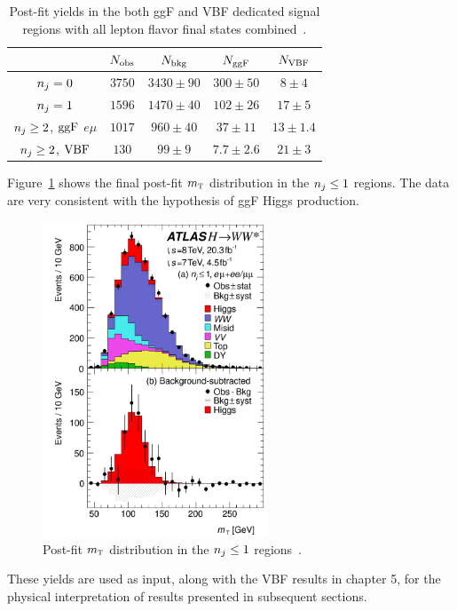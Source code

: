 \begin{table}[h!]
\centering
\captionsetup{justification=centering}

\hspace{-10pt}
\begin{tabular}{|c|c|c|c|c|}
\hline
 & $N_{\rm obs}$ & $N_{\rm bkg}$ & $N_{\rm ggF}$ & $N_{\rm VBF}$ \\ \hline
$n_j = 0$ & $3750$ & $3430 \pm 90$ & $300 \pm 50$ & $8 \pm 4$ \\ \hline
$n_j = 1$ & $1596$ & $1470 \pm 40$ & $102 \pm 26$ & $17 \pm 5$ \\ \hline
$n_j \geq 2$, $\rm ggF$ $e\mu$ & $1017$ & $960 \pm 40$ & $37 \pm 11$ & $13 \pm 1.4$ \\ \hline
$n_j \geq 2$, $\rm VBF$ & $130$ & $99 \pm 9$ & $7.7 \pm 2.6$ & $21 \pm 3$ \\ \hline
\end{tabular}

\caption{
Post-fit yields in the both ggF and VBF dedicated signal regions with all lepton flavor final states combined~\cite{WW2015}. 
}
\label{tab:final-yields}
\end{table}

Figure~\ref{fig:ggF-mT} shows the final post-fit $m_{\textrm{\footnotesize\sc t}}$ distribution in the $n_j \leq 1$ regions. The data are very consistent with the hypothesis of ggF Higgs production. 
%
\begin{figure}[h!]
  \centering
  \captionsetup{justification=centering}

  \includegraphics[width=0.6\textwidth]{figures/ggF_mT}
  \caption{Post-fit $m_{\textrm{\footnotesize\sc t}}$ distribution in the $n_j \leq 1$ regions~\cite{WW2015}.}
  \label{fig:ggF-mT}
\end{figure}
%
These yields are used as input, along with the VBF results in chapter 5, for the physical interpretation of results presented in subsequent sections. 

